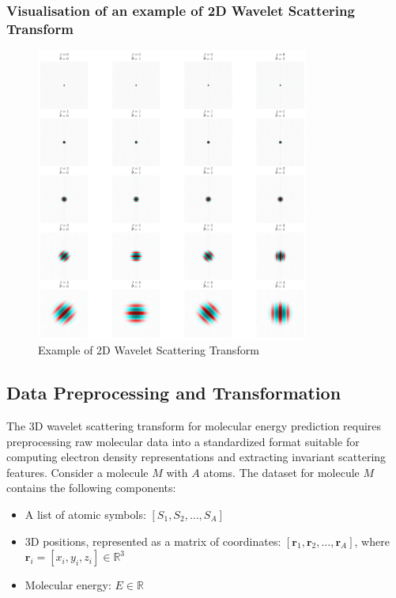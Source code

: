 \documentclass{article}
\begin{document}
\subsubsection{Visualisation of an example of 2D Wavelet Scattering Transform}

\begin{figure}[H]
    \centering
    \includegraphics[width=0.8\textwidth]{Images_Ayoub/Wavelets/Image.png}
    \caption{Example of 2D Wavelet Scattering Transform}
    \label{fig:2D_wavelet_scattering}
\end{figure}

\subsection{Data Preprocessing and Transformation}

The 3D wavelet scattering transform for molecular energy prediction requires preprocessing raw molecular data into a standardized format suitable for computing electron density representations and extracting invariant scattering features. Consider a molecule $M$ with $A$ atoms. The dataset for molecule $M$ contains the following components:

\begin{itemize}
    \item A list of atomic symbols: $[S_1, S_2, \ldots, S_A]$
    \vspace{0.2cm}
    \item 3D positions, represented as a matrix of coordinates: $[\mathbf{r}_1, \mathbf{r}_2, \ldots, \mathbf{r}_A]$, where $\mathbf{r}_i = [x_i, y_i, z_i] \in \mathbb{R}^3$
    \vspace{0.2cm}
    \item Molecular energy: $E \in \mathbb{R}$
\end{itemize}
\end{document}
